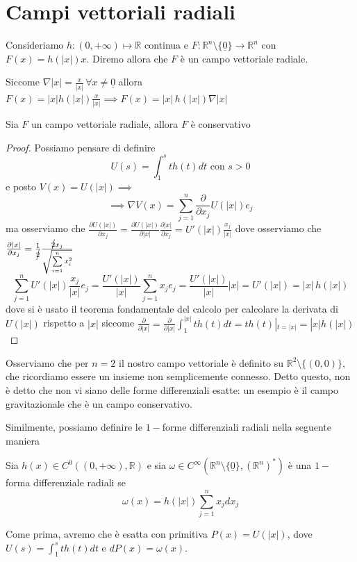 \section{Campi vettoriali radiali}
\begin{definition}
	Consideriamo $h: (0, +\infty) \mapsto \mathbb{R}$ continua e $F: \mathbb{R}^n \setminus \{\underline{0} \} \to \mathbb{R}^n$ con $F(x) = h(|x|)x$.
	Diremo allora che $F$ è un campo vettoriale radiale.
\end{definition}
\begin{remark}
Siccome $\nabla |x| = \frac{x}{|x|} \, \forall x \neq \underline{0}$ allora $F(x) = |x|h(|x|)\frac{x}{|x|} \implies F(x) = |x| \, h(|x|)\nabla |x|$
\end{remark}
\begin{prop}
	Sia $F$ un campo vettoriale radiale, allora $F$ è conservativo
\end{prop}
\begin{proof}
	Possiamo pensare di definire
	$$
	U(s) = \int_1^s t h(t)dt \text{ con } s > 0 
	$$
	e posto $V(x) = U(|x|) \implies$
	$$
	\implies \nabla V(x) = \sum_{j=1}^n \frac{\partial}{\partial x_j} U(|x|)e_j
	$$
	ma osserviamo che $\frac{\partial U(|x|)}{\partial x_j} = \frac{\partial U(|x|)}{\partial |x|} \frac{\partial |x|}{\partial x_j} = U'(|x|) \frac{x_j}{|x|}$ dove osserviamo che $\frac{\partial |x|}{\partial x_j} = \frac{1}{\cancel{2}} \frac{\cancel{2}x_j}{\sqrt{\sum\limits_{i=1}^n x_i^2}}$
	$$
		\sum_{j=1}^n U'(|x|) \frac{x_j}{|x|}e_j = \frac{U'(|x|)}{|x|} \sum_{j=1}^n x_j e_j = \frac{U'(|x|)}{|x|} |x| = U'(|x|) = |x| \, h(|x|)
	$$
	dove si è usato il teorema fondamentale del calcolo per calcolare la derivata di $U(|x|)$ rispetto a $|x|$ siccome $\frac{\partial}{\partial |x|} = \frac{\partial}{\partial |x|} \int_1^{|x|} t h(t) dt = th(t)|_{t=|x|} = |x|h(|x|)$
\end{proof}
\begin{remark}
	Osserviamo che per $n=2$ il nostro campo vettoriale è definito su $\mathbb{R}^2 \setminus \{ (0, 0) \}$, che ricordiamo essere un insieme non semplicemente connesso. Detto questo, non è detto che non vi siano delle forme differenziali esatte: un esempio
	è il campo gravitazionale che è un campo conservativo.
\end{remark}
Similmente, possiamo definire le $1-$forme differenziali radiali nella seguente maniera
\begin{definition}
	Sia $h(x) \in C^0((0, +\infty), \mathbb{R})$ e sia $\omega \in C^{\infty}(\mathbb{R}^n \setminus \{ \underline{0} \}, (\mathbb{R}^n)^*)$ è una $1-$ forma differenziale radiali se
	$$
		\omega(x) = h(|x|)\sum_{j=1}^n x_j dx_j
	$$
\end{definition}
Come prima, avremo che è esatta con primitiva $P(x)=U(|x|)$, dove $U(s) = \int_1^s th(t)dt$ e $dP(x)=\omega(x)$.